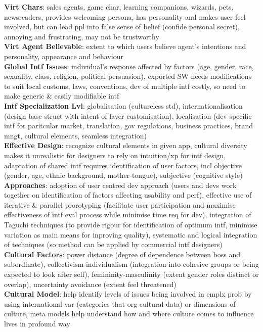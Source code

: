 \documentclass[a4paper]{article}
\begin{document}
\begin{multicols}{3}
        \textbf{Virt Chars}: sales agents, game char, learning companions, wizards, pets, newsreaders, provides welcoming persona, has personality and makes user feel involved, but can lead ppl into false sense of belief (confide personal secret), annoying and frustrating, may not be trustworthy\\
        \textbf{Virt Agent Believable}: extent to which users believe agent's intentions and personality, appearance and behaviour\\
        \underline{\textbf{Global Intf Issues}}: individual's response affected by factors (age, gender, race, sexuality, class, religion, political persuasion), exported SW needs modifications to suit local customs, laws, conventions, dev of multiple intf costly, so need to make generic \& easily modifiable intf\\
        \textbf{Intf Specialization Lvl}: globalisation (cultureless std), internationalisation (design base struct with intent of layer customisation), localisation (dev specific intf for paritcular market, translation, gov regulations, business practices, brand mngt, cultural elements, seamless integration)\\
        \textbf{Effective Design}: recognize cultural elements in given app, cultural diversity makes it unrealistic for designers to rely on intuition/xp for intf design, adaptation of shared intf requires identification of user factors, incl objective (gender, age, ethnic background, mother-tongue), subjective (cognitive style)\\
        \textbf{Approaches}: adoption of user centred dev approach (users and devs work together on identification of factors affecting usability and perf), effective use of iterative \& parallel prorotyping (facilitate user participation and maximise effectiveness of intf eval process while minimise time req for dev), integration of Taguchi techniques (to provide rigour for identification of optimum intf, minimise variation as main means for inproving quality), systematic and logical integration of techniques (so method can be applied by commercial intf designers)\\
        \textbf{Cultural Factors}: power distance (degree of dependence between boss and subordinate), collectivism-individualism (integration into cohesive groups or being expected to look after self), femininity-masculinity (extent gender roles distinct or overlap), uncertainty avoidance (extent feel threatened)\\
        \textbf{Cultural Model}: help identify levels of issues being involved in cmplx prob by using international var (categories that org cultural data) or dimensions of culture, meta models help understand how and where culture comes to influence lives in profound way\\

\end{multicols}
\end{document}
